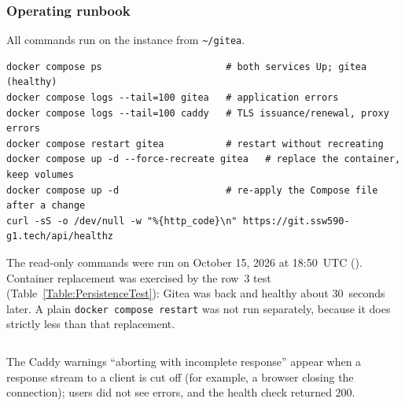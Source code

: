 \subsubsection{Operating runbook}
All commands run on the instance from \texttt{\textasciitilde/gitea}.
\begin{verbatim}
docker compose ps                      # both services Up; gitea (healthy)
docker compose logs --tail=100 gitea   # application errors
docker compose logs --tail=100 caddy   # TLS issuance/renewal, proxy errors
docker compose restart gitea           # restart without recreating
docker compose up -d --force-recreate gitea   # replace the container, keep volumes
docker compose up -d                   # re-apply the Compose file after a change
curl -sS -o /dev/null -w "%{http_code}\n" https://git.ssw590-g1.tech/api/healthz
\end{verbatim}
The read-only commands were run on October 15, 2026 at 18:50~UTC
(). Container replacement was exercised by the row~3 test
(Table~\ref{Table:PersistenceTest}): Gitea was back and healthy about
30~seconds later. A plain \texttt{docker compose restart} was not run
separately, because it does strictly less than that replacement.
\begin{longlisting}
\inputminted[fontsize=\scriptsize]{text}{evidence/24-runbook-readonly-checks-on-server-sakshi-2026-10-15.txt}
\caption{Read-only runbook commands on the EC2 instance, October 15, 2026, 18:50~UTC (real output; client addresses removed from the Caddy lines).}
\label{Listing:E24}
\end{longlisting}
The Caddy warnings ``aborting with incomplete response'' appear when a
response stream to a client is cut off (for example, a browser closing the
connection); users did not see errors, and the health check returned 200.

